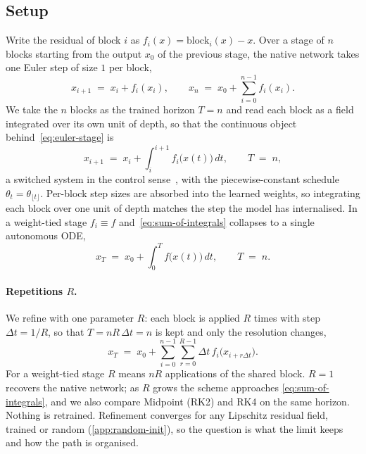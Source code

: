 \subsection{Setup}
\label{sec:setup}

Write the residual of block $i$ as $f_i(x)=\mathrm{block}_i(x)-x$.
Over a stage of $n$ blocks starting from the output $x_0$ of the previous stage, the
native network takes one Euler step of size $1$ per block,
\begin{equation}
    x_{i+1} \;=\; x_i + f_i(x_i),
    \qquad
    x_n \;=\; x_0 + \sum_{i=0}^{n-1} f_i(x_i).
    \label{eq:euler-stage}
\end{equation}
We take the $n$ blocks as the trained horizon $T{=}n$ and read each block as a field
integrated over its own unit of depth, so that the continuous object
behind~\eqref{eq:euler-stage} is
\begin{equation}
    x_{i+1} \;=\; x_i + \int_{i}^{i+1} f_i\bigl(x(t)\bigr)\,dt,
    \qquad T \;=\; n,
    \label{eq:sum-of-integrals}
\end{equation}
a switched system in the control sense~\citep{liberzon2003switching}, with the
piecewise-constant schedule $\theta_t=\theta_{\lfloor t\rfloor}$.
Per-block step sizes are absorbed into the learned weights, so integrating each block
over one unit of depth matches the step the model has internalised.
In a weight-tied stage $f_i\equiv f$ and~\eqref{eq:sum-of-integrals} collapses to a
single autonomous ODE,
\begin{equation}
    x_T \;=\; x_0 + \int_{0}^{T} f\bigl(x(t)\bigr)\,dt,
    \qquad T \;=\; n.
    \label{eq:weight-tied-ode}
\end{equation}

\paragraph{Repetitions $R$.}
We refine with one parameter $R$: each block is applied $R$ times with step
$\Delta t{=}1/R$, so that $T{=}nR\,\Delta t{=}n$ is kept and only the resolution
changes,
\begin{equation}
    x_T \;=\; x_0 + \sum_{i=0}^{n-1} \sum_{r=0}^{R-1} \Delta t\, f_i\bigl(x_{i + r\Delta t}\bigr).
    \label{eq:refined-stage}
\end{equation}
For a weight-tied stage $R$ means $nR$ applications of the shared block.
$R{=}1$ recovers the native network; as $R$ grows the scheme approaches
\eqref{eq:sum-of-integrals}, and we also compare Midpoint (RK2) and RK4 on the same
horizon.
Nothing is retrained.
Refinement converges for any Lipschitz residual field, trained or random
(\cref{app:random-init}), so the question is what the limit keeps and how the path
is organised.

